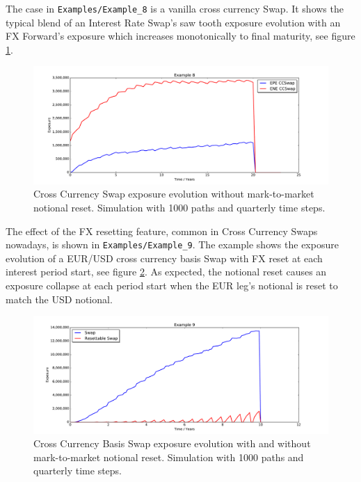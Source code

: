\documentclass[12pt, a4paper]{article}
\begin{document}
The case in {\tt Examples/Example\_8} is a vanilla cross currency Swap. It shows the typical blend of an Interest Rate
Swap's saw tooth exposure evolution with an FX Forward's exposure which increases monotonically to final maturity, see
figure \ref{fig_6}.
\begin{figure}[h!]
\begin{center}
\includegraphics[scale=0.45]{mpl_ccswap.pdf}
\end{center}
\caption{Cross Currency Swap exposure evolution without mark-to-market notional reset. Simulation with 1000 paths and
  quarterly time steps.}
\label{fig_6}
\end{figure}

The effect of the FX resetting feature, common in Cross Currency Swaps nowadays, is shown in {\tt Examples/Example\_9}.
The example shows the exposure evolution of a EUR/USD cross currency basis Swap with FX reset at each interest period
start, see figure \ref{fig_6b}. As expected, the notional reset causes an exposure collapse at each period start when
the EUR leg's notional is reset to match the USD notional.
\begin{figure}[h!]
\begin{center}
\includegraphics[scale=0.45]{mpl_xccy_reset.pdf}
\end{center}
\caption{Cross Currency Basis Swap exposure evolution with and without mark-to-market notional reset. Simulation with
  1000 paths and quarterly time steps.}
\label{fig_6b}
\end{figure}
  
\end{document}

